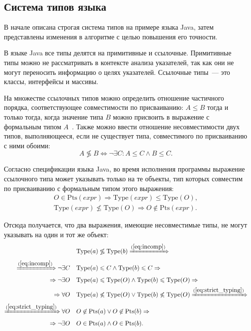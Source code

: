 \documentclass[14pt,titlepage]{extarticle}
\newcommand{\Type}[1]{\textrm{Type}(#1)}
\newcommand{\Pts}[1]{\textrm{Pts}(#1)}
\renewcommand{\leq}{\leqslant}
\newcommand{\incomp}{\not\lessgtr}
\newcommand{\eng}[1]{{\English#1}}
\newcommand{\java}{\eng{Java}\xspace}
\begin{document}
    \subsection{Система типов языка}
      \label{section:type_system}

      В начале описана строгая система типов на примере языка \java, затем
      представлены изменения в алгоритме с целью повышения его точности.

      В языке \java все типы делятся на примитивные и ссылочные.
      Примитивные типы можно не рассматривать в контексте анализа указателей,
      так как они не могут переносить информацию о целях указателей.
      Ссылочные типы~--- это классы, интерфейсы и массивы.

      На множестве ссылочных типов можно определить отношение частичного
      порядка, соответствующее совместимости по присваиванию:
      $A \leq B$ тогда и только тогда, когда значение типа $B$ можно присвоить
      в выражение с формальным типом $A$~\cite{nastia_type_analysis}.
      Также можно ввести отношение несовместимости двух типов, выполняющееся,
      если не существует типа, совместимого по присваиванию с ними обоими:
      \begin{equation}\label{eq:incomp}
        A \incomp B
        \Leftrightarrow
        \lnot \exists C\colon A \leq C \land B \leq C.
      \end{equation}

      Согласно спецификации языка \java, во время исполнения программы
      выражение ссылочного типа может указывать только на те объекты, тип
      которых совместим по присваиванию с формальным типом этого выражения:
      \begin{gather}
        O \in \Pts{expr}
        \Rightarrow
        \Type{expr} \leq \Type{O}, \\
        \label{eq:strict_typing}
        \Type{expr} \not\leq \Type{O}
        \Rightarrow
        O \not\in \Pts{expr}.
      \end{gather}

      Отсюда получается, что два выражения, имеющие несовместимые типы, не
      могут указывать на один и тот же объект:
      \begin{align*}
        \quad& \Type{a} \incomp \Type{b}
        \xRightarrow{(\ref{eq:incomp})} \\ \xRightarrow{(\ref{eq:incomp})}
        \lnot \exists C \quad& \Type{a} \leq C \land \Type{b} \leq C
        \Rightarrow \\ \Rightarrow
        \lnot \exists O \quad& \Type{a} \leq \Type{O}
                         \land \Type{b} \leq \Type{O}
        \Rightarrow \\ \Rightarrow
        \forall O \quad& \Type{a} \not\leq \Type{O}
                    \lor \Type{b} \not\leq \Type{O}
        \xRightarrow{(\ref{eq:strict_typing})} \\ \xRightarrow{(\ref{eq:strict_typing})}
        \forall O \quad& O \not\in \Pts{a}
                    \lor O \not\in \Pts{b}
        \Rightarrow \\ \Rightarrow
        \lnot \exists O \quad& O \in \Pts{a}
                         \land O \in \Pts{b}.
      \end{align*}
\end{document}
